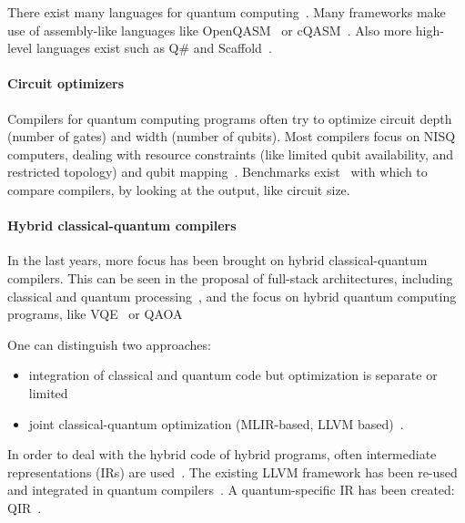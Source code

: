 There exist many languages for quantum computing~\cite{chong_programming_2017, heim_quantum_2020}.
Many frameworks make use of assembly-like languages like OpenQASM~\cite{cross_open_2017} or cQASM~\cite{khammassi_cqasm_2018}.
Also more high-level languages exist such as Q\# and Scaffold~\cite{svore_q_2018, litteken_updated_2020, heim_quantum_2020}.

\paragraph{Circuit optimizers}
Compilers for quantum computing programs often try to optimize circuit depth (number of gates) and width (number of qubits).
Most compilers focus on \ac{NISQ} computers, dealing with resource constraints (like limited qubit availability, and restricted topology) \cite{chong_programming_2017, murali_full-stack_2019, bandic_full-stack_2022} and qubit mapping~\cite{li_tackling_2019, zhang_context-sensitive_2020, bandic_mapping_2023, nishio_extracting_2020}.
Benchmarks exist~\cite{li_qasmbench_2023, tomesh_supermarq_2022} with which to compare compilers, by looking at the output, like circuit size.

\paragraph{Hybrid classical-quantum compilers}
In the last years, more focus has been brought on hybrid classical-quantum compilers.
This can be seen in the proposal of full-stack architectures, including classical and quantum processing~\cite{murali_full-stack_2019, khammassi_openql_2021, mccaskey_xacc_2020}, and the focus on hybrid quantum computing programs, like \acf{VQE}~\cite{diadamo2021distributed, liu2022layer} or \acf{QAOA}~\cite{farhi2014quantum}

One can distinguish two approaches:
\begin{itemize}
\item integration of classical and quantum code but optimization is separate or limited~\cite{litteken_updated_2020, fux_quingo_2021, khalate_llvm-based_2022, younis_quantum_2022}
\item joint classical-quantum optimization (MLIR-based, LLVM based)~\cite{mccaskey_mlir_2021, ittah_enabling_2022, nguyen_retargetable_2022, peduri_qssa_2022}.
\end{itemize}

In order to deal with the hybrid code of hybrid programs, often intermediate representations (IRs) are used~\cite{nigam_compiler_2021, nishio_inquir_2023}.
The existing LLVM framework has been re-used and integrated in quantum compilers~\cite{murali_noise-adaptive_2019, murali_full-stack_2019, litteken_updated_2020}.
A quantum-specific IR has been created: QIR~\cite{haner_software_2018, geller_introducing_2020}.

